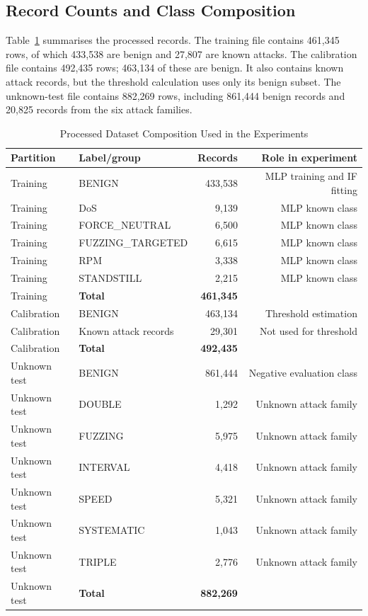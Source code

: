 \documentclass[journal]{IEEEtran}
\begin{document}
\subsection{Record Counts and Class Composition}
Table~\ref{tab:datasetcounts} summarises the processed records. The training file contains 461,345 rows, of which 433,538 are benign and 27,807 are known attacks. The calibration file contains 492,435 rows; 463,134 of these are benign. It also contains known attack records, but the threshold calculation uses only its benign subset. The unknown-test file contains 882,269 rows, including 861,444 benign records and 20,825 records from the six attack families.

\begin{table}[!t]
\caption{Processed Dataset Composition Used in the Experiments}
\label{tab:datasetcounts}
\centering\footnotesize
\begin{tabular}{llrr}
\toprule
Partition & Label/group & Records & Role in experiment\\
\midrule
Training & BENIGN & 433,538 & MLP training and IF fitting\\
Training & DoS & 9,139 & MLP known class\\
Training & FORCE\_NEUTRAL & 6,500 & MLP known class\\
Training & FUZZING\_TARGETED & 6,615 & MLP known class\\
Training & RPM & 3,338 & MLP known class\\
Training & STANDSTILL & 2,215 & MLP known class\\
\midrule
Training & \textbf{Total} & \textbf{461,345} & \\
Calibration & BENIGN & 463,134 & Threshold estimation\\
Calibration & Known attack records & 29,301 & Not used for threshold\\
Calibration & \textbf{Total} & \textbf{492,435} & \\
\midrule
Unknown test & BENIGN & 861,444 & Negative evaluation class\\
Unknown test & DOUBLE & 1,292 & Unknown attack family\\
Unknown test & FUZZING & 5,975 & Unknown attack family\\
Unknown test & INTERVAL & 4,418 & Unknown attack family\\
Unknown test & SPEED & 5,321 & Unknown attack family\\
Unknown test & SYSTEMATIC & 1,043 & Unknown attack family\\
Unknown test & TRIPLE & 2,776 & Unknown attack family\\
Unknown test & \textbf{Total} & \textbf{882,269} & \\
\bottomrule
\end{tabular}
\end{table}
\end{document}
